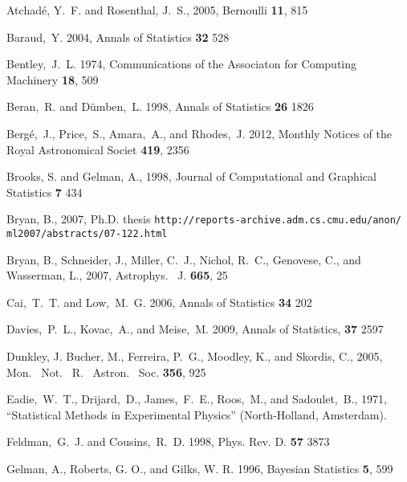 \documentclass[useAMS,usenatbib]{aastex}
\begin{document}
\begin{thebibliography}{99}

Atchad\'e, Y.~F. and Rosenthal, J.~S., 2005, Bernoulli {\bf 11}, 815

Baraud,~Y. 2004, Annals of Statistics {\bf 32} 528

Bentley,~J.~L. 1974, Communications of the Associaton for Computing Machinery
{\bf 18}, 509

Beran,~R. and D\"umben,~L. 1998, Annals of Statistics {\bf 26} 1826

Berg\'e,~J., Price,~S., Amara,~A., and Rhodes,~J. 2012,
Monthly Notices of the Royal Astronomical Societ {\bf 419}, 2356

Brooks, S. and Gelman, A., 1998, 
Journal of Computational and Graphical Statistics
{\bf 7} 434

Bryan, B., 2007, Ph.D. thesis
\verb|http://reports-archive.adm.cs.cmu.edu/anon/|
\verb|ml2007/abstracts/07-122.html|

Bryan, B., Schneider, J., Miller, C.~J., Nichol, R.~C., Genovese, C., and
Wasserman, L., 2007,
Astrophys. \ J. {\bf 665}, 25

Cai,~T.~T. and Low,~M.~G. 2006, Annals of Statistics {\bf 34} 202

Davies,~P.~L., Kovac,~A., and Meise,~M. 2009, Annals of Statistics,
{\bf 37} 2597

Dunkley, J. Bucher, M., Ferreira, P.~G., Moodley, K., and Skordis, C.,
2005,  
Mon. \ Not. \ R. \ Astron. \ Soc. {\bf 356},
925

Eadie,~W.~T., Drijard,~D., James,~F.~E., Roos,~M., and Sadoulet,~B.,
1971, ``Statistical Methods in Experimental Physics''
(North-Holland, Amsterdam).

Feldman,~G.~J. and Cousins,~R.~D. 1998, Phys. Rev. D. {\bf 57} 3873

Gelman, A., Roberts, G. O., and Gilks, W. R. 1996,
Bayesian Statistics {\bf 5}, 599


\end{thebibliography}
\end{document}
